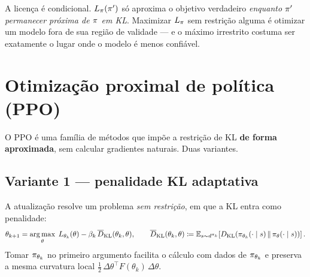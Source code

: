 \documentclass[11pt, a4paper]{article}
\newcommand{\polnovo}{\pol'}
\newcommand{\KLd}[2]{D_{\mathrm{KL}}\!\left(#1\,\|\,#2\right)}
\newcommand{\KLbar}{\overline{D}_{\mathrm{KL}}}
\newcommand{\Lsub}[1]{L_{#1}}
\begin{document}
\begin{alertabox}
A licença é condicional. $\Lsub{\pol}(\polnovo)$ só aproxima o objetivo
verdadeiro \emph{enquanto $\polnovo$ permanecer próxima de $\pi$ em KL}.
Maximizar $\Lsub{\pol}$ sem restrição alguma é otimizar um modelo fora de sua
região de validade --- e o máximo irrestrito costuma ser exatamente o lugar
onde o modelo é menos confiável.
\end{alertabox}

\section{Otimização proximal de política (PPO)}

O PPO é uma família de métodos que impõe a restrição de KL \textbf{de forma
aproximada}, sem calcular gradientes naturais. Duas variantes.

\subsection{Variante 1 --- penalidade KL adaptativa}

A atualização resolve um problema \emph{sem restrição}, em que a KL entra como
penalidade:
\[
  \theta_{k+1} = \argmax_\theta\; \Lsub{\theta_k}(\theta)
    - \beta_k\, \KLbar(\theta_k, \theta),
  \qquad
  \KLbar(\theta_k,\theta) \defeq \E_{s\sim d^{\pol_k}}\!\left[
    \KLd{\pol_{\theta_k}(\cdot\mid s)}{\pol_\theta(\cdot\mid s)}\right].
\]
Tomar $\pi_{\theta_k}$ no primeiro argumento facilita o cálculo com dados de
$\pi_{\theta_k}$ e preserva a mesma curvatura local
$\tfrac12\,\Delta\theta^\top F(\theta_k)\,\Delta\theta$.
\end{document}

